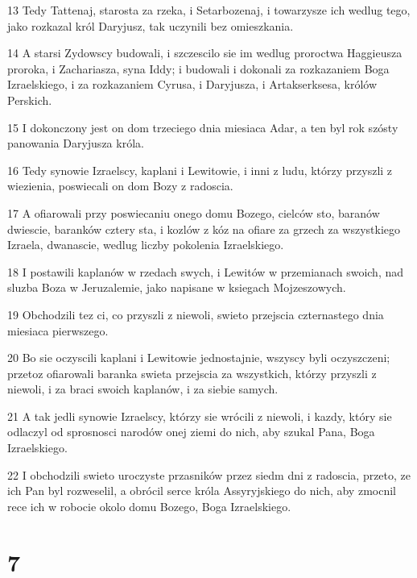 \par 13 Tedy Tattenaj, starosta za rzeka, i Setarbozenaj, i towarzysze ich wedlug tego, jako rozkazal król Daryjusz, tak uczynili bez omieszkania.
\par 14 A starsi Zydowscy budowali, i szczescilo sie im wedlug proroctwa Haggieusza proroka, i Zachariasza, syna Iddy; i budowali i dokonali za rozkazaniem Boga Izraelskiego, i za rozkazaniem Cyrusa, i Daryjusza, i Artakserksesa, królów Perskich.
\par 15 I dokonczony jest on dom trzeciego dnia miesiaca Adar, a ten byl rok szósty panowania Daryjusza króla.
\par 16 Tedy synowie Izraelscy, kaplani i Lewitowie, i inni z ludu, którzy przyszli z wiezienia, poswiecali on dom Bozy z radoscia.
\par 17 A ofiarowali przy poswiecaniu onego domu Bozego, cielców sto, baranów dwiescie, baranków cztery sta, i kozlów z kóz na ofiare za grzech za wszystkiego Izraela, dwanascie, wedlug liczby pokolenia Izraelskiego.
\par 18 I postawili kaplanów w rzedach swych, i Lewitów w przemianach swoich, nad sluzba Boza w Jeruzalemie, jako napisane w ksiegach Mojzeszowych.
\par 19 Obchodzili tez ci, co przyszli z niewoli, swieto przejscia czternastego dnia miesiaca pierwszego.
\par 20 Bo sie oczyscili kaplani i Lewitowie jednostajnie, wszyscy byli oczyszczeni; przetoz ofiarowali baranka swieta przejscia za wszystkich, którzy przyszli z niewoli, i za braci swoich kaplanów, i za siebie samych.
\par 21 A tak jedli synowie Izraelscy, którzy sie wrócili z niewoli, i kazdy, który sie odlaczyl od sprosnosci narodów onej ziemi do nich, aby szukal Pana, Boga Izraelskiego.
\par 22 I obchodzili swieto uroczyste przasników przez siedm dni z radoscia, przeto, ze ich Pan byl rozweselil, a obrócil serce króla Assyryjskiego do nich, aby zmocnil rece ich w robocie okolo domu Bozego, Boga Izraelskiego.

\chapter{7}

